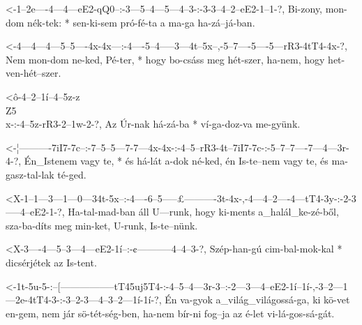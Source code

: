   {<-1--2e----4---4---eE2-qQ0--:-3---5--4---5---4--3-:-3-3--4--2--eE2-1--1-?,}
  {  Bi-zony, mon-dom nék-tek: * sen-ki-sem pró-fé-ta  a ma-ga ha-zá--já-ban.}



  {<-4---4---4---5--5----4x-4x---:-4----5--4-----3---4t--5x--,-5--7----5----5---rR3-4tT4-4x-?,}
  {  Nem mon-dom ne-ked, Pé-ter, * hogy bo-csáss meg hét-szer, ha-nem, hogy het-ven-hét--szer.}




  {<ô-4--2--1í--4--5z-z\\Z5\\x-:-4--5z-rR3-2--1w-2-?,}
  {   Az Úr-nak há-zá-ba       * ví-ga-doz-va me-gyünk.}


  {<-¦----------7iI7-7c--:-7--5--5---7-7---4x-4x-:-4--5--rR3-4t--7iI7-7c-:-5--7--7----7---4---3r-4-?,}
  {  Én_Istenem vagy te, * és há-lát a-dok né-ked, én Is-te--nem vagy te,  és ma-gasz-tal-lak té-ged.}

  {<X-1--1---3---1---0---34t-5x--:-4----6--5-----£----------3t-4x-,-4---4--2----4---tT4-3y-:-2-3-----4--eE2-1-?,}
  {   Ha-tal-mad-ban áll U---runk, hogy ki-ments a_halál_ke-zé-ből, sza-ba-díts meg min-ket, U-runk, Is-te--nünk.}

  {<X-3----4---5--3---4---eE2-1í--:-¢-----------4--4--3-?,}
  {   Szép-han-gú cim-bal-mok-kal * dicsérjétek az Is-tent.}


  {<-1t-5u-5-:--[-----------------tT45uj5T4-:-4--5--4---3r-3--:-2---3---4--eE2-1í--1í-,-3--2---1---2e-4tT4-3-:-3--2-3---4--3--2---1í-1í-?,}
  {  Én va-gyok a_világ_világossá-ga,         ki kö-vet en-gem, nem jár sö-tét-ség-ben, ha-nem bír-ni fog--ja  az é-let vi-lá-gos-sá-gát.}

